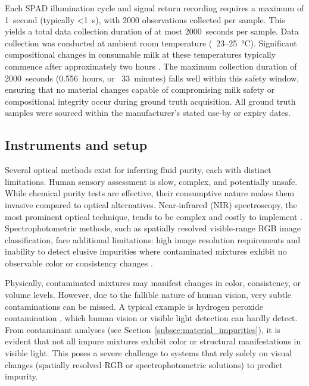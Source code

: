 \documentclass[12pt,a4paper,oneside]{report}
\begin{document}
Each SPAD illumination cycle and signal return recording requires a maximum of 1~second (typically <1~s), with 2000 observations collected per sample. This yields a total data collection duration of at most 2000~seconds per sample. Data collection was conducted at ambient room temperature (~23--25~°C). Significant compositional changes in consumable milk at these temperatures typically commence after approximately two hours \cite{lott2023,burgwald1947}. The maximum collection duration of 2000~seconds (0.556~hours, or ~33~minutes) falls well within this safety window, ensuring that no material changes capable of compromising milk safety or compositional integrity occur during ground truth acquisition. All ground truth samples were sourced within the manufacturer's stated use-by or expiry dates.

\subsection{Instruments and setup}
\label{subsec:instruments_setup_chapter6}

Several optical methods exist for inferring fluid purity, each with distinct limitations. Human sensory assessment is slow, complex, and potentially unsafe. While chemical purity tests are effective, their consumptive nature makes them invasive compared to optical alternatives. Near-infrared (NIR) spectroscopy, the most prominent optical technique, tends to be complex and costly to implement \cite{aernouts2015,melfsen2012,biggs1967,barbano1989}. Spectrophotometric methods, such as spatially resolved visible-range RGB image classification, face additional limitations: high image resolution requirements and inability to detect elusive impurities where contaminated mixtures exhibit no observable color or consistency changes \cite{chandra2024,joolaei2025}.

Physically, contaminated mixtures may manifest changes in color, consistency, or volume levels. However, due to the fallible nature of human vision, very subtle contaminations can be missed. A typical example is hydrogen peroxide contamination \cite{gregory1961}, which human vision or visible light detection can hardly detect. From contaminant analyses (see Section~\ref{subsec:material_impurities}), it is evident that not all impure mixtures exhibit color or structural manifestations in visible light. This poses a severe challenge to systems that rely solely on visual changes (spatially resolved RGB or spectrophotometric solutions) to predict impurity.
\end{document}

